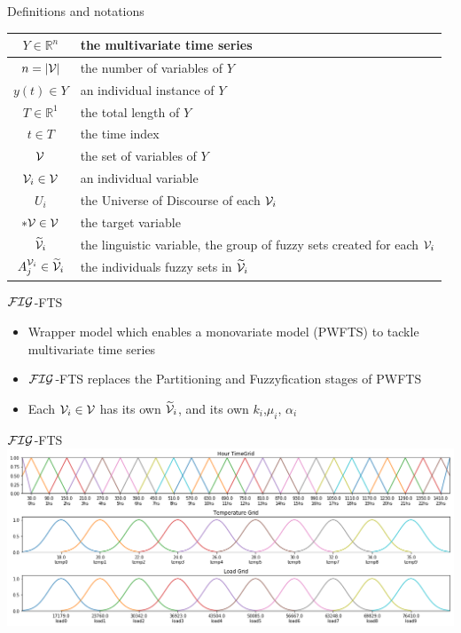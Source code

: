 \documentclass{beamer}
\begin{document}
\begin{frame}{Definitions and notations}
\begin{table}[]
    \centering
    \begin{tabular}{|c|m{7cm}|} \hline
        $Y \in \mathbb{R}^n$ &  the multivariate time series \\ \hline
        $n = |\mathcal{V}|$ & the number of variables of $Y$  \\ \hline
        $y(t) \in Y$ & an individual instance of $Y$ \\ \hline
        $T \in \mathbb{R}^1$ & the total length of $Y$ \\ \hline
        $t \in T$ & the time index \\ \hline
        $\mathcal{V}$ & the set of variables of $Y$ \\ \hline
        $\mathcal{V}_i \in \mathcal{V}$ & an individual variable \\ \hline
        $U_i$ & the Universe of Discourse of each  $\mathcal{V}_i$ \\ \hline
        $*\mathcal{V} \in \mathcal{V}$ & the target variable \\ \hline
        $\widetilde{\mathcal{V}}_i$ & the linguistic variable, the group of fuzzy sets created for each $\mathcal{V}_i$ \\ \hline
        $A_j^{\mathcal{V}_i} \in \widetilde{\mathcal{V}}_i$ & the individuals fuzzy sets in $\widetilde{\mathcal{V}}_i$ \\ \hline
    \end{tabular}
\end{table}
\end{frame}

\begin{frame}{$\mathcal{FIG}$-FTS}
\linespread{2}
\begin{itemize}
    \item Wrapper model which enables a monovariate model (PWFTS) to tackle multivariate time series
    \item $\mathcal{FIG}$-FTS replaces the Partitioning and Fuzzyfication stages of PWFTS
    \item Each $\mathcal{V}_i \in \mathcal{V}$ has its own $\widetilde{\mathcal{V}}_i$, and its own $k_i$,$\mu_i$, $\alpha_i$
\end{itemize}
\end{frame}


\begin{frame}{$\mathcal{FIG}$-FTS}
\includegraphics[width=\textwidth]{figures/variables_malaysia.png}
\end{frame}
\end{document}
